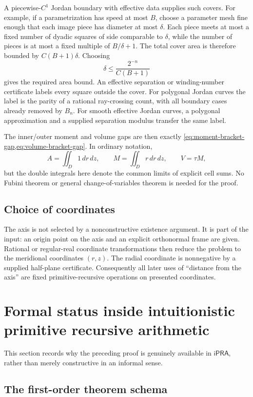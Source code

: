 \documentclass[11pt]{article}
\theoremstyle{definition}
\newcommand{\ipra}{\mathsf{iPRA}}
\begin{document}
A piecewise-$C^1$ Jordan boundary with effective data supplies such covers.
For example, if a parametrization has speed at most $B$, choose a parameter
mesh fine enough that each image piece has diameter at most $\delta$.  Each
piece meets at most a fixed number of dyadic squares of side comparable to
$\delta$, while the number of pieces is at most a fixed multiple of
$B/\delta+1$.  The total cover area is therefore bounded by
$C(B+1)\delta$.  Choosing
\[
 \delta\leq\frac{2^{-n}}{C(B+1)}
\]
gives the required area bound.  An effective separation or winding-number
certificate labels every square outside the cover.  For polygonal Jordan
curves the label is the parity of a rational ray-crossing count, with all
boundary cases already removed by $B_n$.  For smooth effective Jordan curves,
a polygonal approximation and a supplied separation modulus transfer the same
label.

The inner/outer moment and volume gaps are then exactly
\cref{eq:moment-bracket-gap,eq:volume-bracket-gap}.  In ordinary notation,
\[
 A=\iint_D1\,dr\,dz,
 \qquad
 M=\iint_Dr\,dr\,dz,
 \qquad
 V=\tau M,
\]
but the double integrals here denote the common limits of explicit cell sums.
No Fubini theorem or general change-of-variables theorem is needed for the
proof.

\subsection{Choice of coordinates}

The axis is not selected by a nonconstructive existence argument.  It is part
of the input: an origin point on the axis and an explicit orthonormal frame are
given.  Rational or regular-real coordinate transformations then reduce the
problem to the meridional coordinates $(r,z)$.  The radial coordinate is
nonnegative by a supplied half-plane certificate.  Consequently all later
uses of ``distance from the axis'' are fixed primitive-recursive operations on
presented coordinates.

\section{Formal status inside intuitionistic primitive recursive arithmetic}
\label{sec:ipra-audit}

This section records why the preceding proof is genuinely available in
$\ipra$, rather than merely constructive in an informal sense.

\subsection{The first-order theorem schema}
\end{document}
